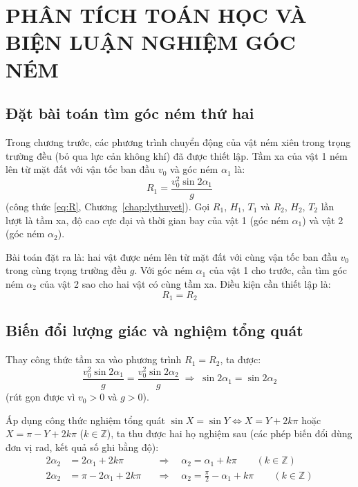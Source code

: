 \chapter{PHÂN TÍCH TOÁN HỌC VÀ BIỆN LUẬN NGHIỆM GÓC NÉM}\label{chap:toanhoc}

\section{Đặt bài toán tìm góc ném thứ hai}
Trong chương trước, các phương trình chuyển động của vật ném xiên trong trọng trường đều (bỏ qua lực cản không khí) đã được thiết lập. Tầm xa của vật 1 ném lên từ mặt đất với vận tốc ban đầu $v_0$ và góc ném $\alpha_1$ là:
\[ R_1 = \frac{v_0^2\sin 2\alpha_1}{g} \]
(công thức \eqref{eq:R}, Chương~\ref{chap:lythuyet}). Gọi $R_1$, $H_1$, $T_1$ và $R_2$, $H_2$, $T_2$ lần lượt là tầm xa, độ cao cực đại và thời gian bay của vật 1 (góc ném $\alpha_1$) và vật 2 (góc ném $\alpha_2$).

Bài toán đặt ra là: hai vật được ném lên từ mặt đất với cùng vận tốc ban đầu $v_0$ trong cùng trọng trường đều $g$. Với góc ném $\alpha_1$ của vật 1 cho trước, cần tìm góc ném $\alpha_2$ của vật 2 sao cho hai vật có cùng tầm xa. Điều kiện cần thiết lập là:
\[ R_1 = R_2 \]

\section{Biến đổi lượng giác và nghiệm tổng quát}
Thay công thức tầm xa vào phương trình $R_1 = R_2$, ta được:
\[ \frac{v_0^2\sin 2\alpha_1}{g} = \frac{v_0^2\sin 2\alpha_2}{g} \;\Rightarrow\; \sin 2\alpha_1 = \sin 2\alpha_2 \]
(rút gọn được vì $v_0 > 0$ và $g > 0$).

Áp dụng công thức nghiệm tổng quát $\sin X = \sin Y \Leftrightarrow X = Y + 2k\pi$ hoặc $X = \pi - Y + 2k\pi$ ($k \in \mathbb{Z}$), ta thu được hai họ nghiệm sau (các phép biến đổi dùng đơn vị rad, kết quả số ghi bằng độ):
\begin{align*}
  2\alpha_2 &= 2\alpha_1 + 2k\pi       &&\Rightarrow\quad \alpha_2 = \alpha_1 + k\pi \qquad (k \in \mathbb{Z}) \\
  2\alpha_2 &= \pi - 2\alpha_1 + 2k\pi &&\Rightarrow\quad \alpha_2 = \frac{\pi}{2} - \alpha_1 + k\pi \qquad (k \in \mathbb{Z})
\end{align*}

